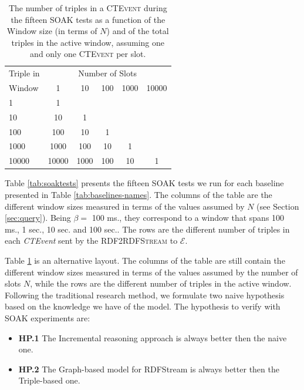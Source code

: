 \begin{table}[htb]
	\centering
	\normalsize
	\begin{tabular}{l | ccccc} %
	  	\hline
		Triple in & \multicolumn{5}{c}{Number of Slots}  \\
		Window  & 1 & 10 & 100 & 1000&10000\\
		\hline
		1  	 & 1\\
		10   & 10  & 1 \\
		100  & 100 & 10 & 1\\
		1000 & 1000& 100& 10& 1\\
		10000& 10000 & 1000& 100& 10& 1\\
		\hline %
	 \end{tabular}
	\caption{The number of triples in a \textsc{CTEvent} during the fifteen SOAK tests as a function of the Window size (in terms of $N$) and of the total triples in the active window, assuming one and only one \textsc{CTEvent} per slot.}
	\label{tab:soaktests-alt}
\end{table}

Table \ref{tab:soaktests} presents the fifteen SOAK tests we run for each baseline presented in Table \ref{tab:baselines-names}. The columns of the table are the different window sizes measured in terms of the values assumed by $N$ (see Section \ref{sec:query}).  Being $\beta=$ 100 ms., they correspond to a window that spans 100 ms., 1 sec., 10 sec. and 100 sec.. The rows are the different number of triples in each \textit{CTEvent} sent by the \textsc{RDF2RDFStream} to $\mathcal{E}$.%

Table \ref{tab:soaktests-alt} is an alternative layout. The columns of the table are still contain the different window sizes measured in terms of the values assumed by the number of slots $N$, while the rows are the different number of triples in the active window. \\

Following the traditional research method, we formulate two naive hypothesis based on the knowledge we have of the model. The hypothesis to verify with SOAK experiments are:
\begin{itemize}
\item \textbf{HP.1} The Incremental reasoning approach is always better then the naive one.
\item \textbf{HP.2} The Graph-based model for RDFStream is always better then the Triple-based one.
\end{itemize}

